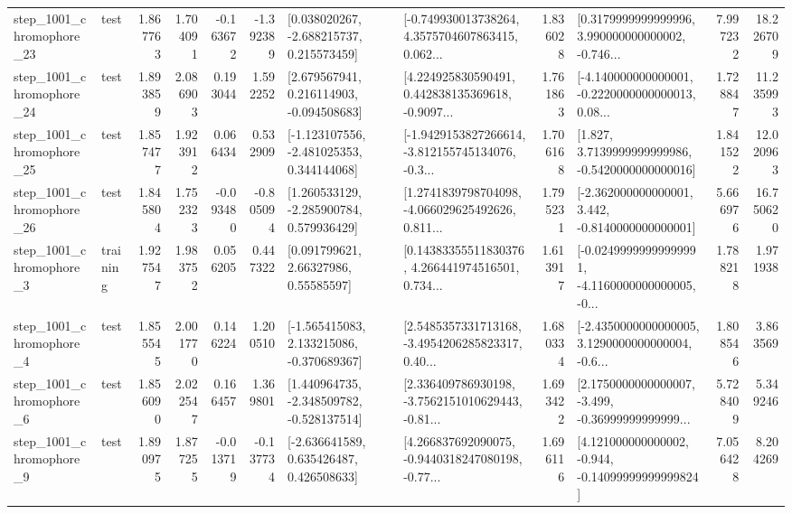 \begin{tabular}{llrrrrllrlrr}
 step\_1001\_chromophore\_23 &      test &      1.867763 &    1.704091 &     -0.163672 & -1.392389 &    [0.038020267, -2.688215737, 0.215573459] &  [-0.749930013738264, 4.3575704607863415, 0.062... &       1.836028 &  [0.3179999999999996, 3.990000000000002, -0.746... &            7.997232 &         18.226709 \\
 step\_1001\_chromophore\_24 &      test &      1.893859 &    2.086903 &      0.193044 &  1.592252 &    [2.679567941, 0.216114903, -0.094508683] &  [4.224925830590491, 0.442838135369618, -0.9097... &       1.761863 &  [-4.140000000000001, -0.2220000000000013, 0.08... &            1.728847 &         11.235993 \\
 step\_1001\_chromophore\_25 &      test &      1.857477 &    1.923912 &      0.066434 &  0.532909 &   [-1.123107556, -2.481025353, 0.344144068] &  [-1.9429153827266614, -3.812155745134076, -0.3... &       1.706168 &   [1.827, 3.7139999999999986, -0.5420000000000016] &            1.841522 &         12.020963 \\
 step\_1001\_chromophore\_26 &      test &      1.845804 &    1.752323 &     -0.093480 & -0.805094 &    [1.260533129, -2.285900784, 0.579936429] &  [1.2741839798704098, -4.066029625492626, 0.811... &       1.795231 &   [-2.362000000000001, 3.442, -0.8140000000000001] &            5.666976 &         16.750620 \\
  step\_1001\_chromophore\_3 &  training &      1.927547 &    1.983752 &      0.056205 &  0.447322 &       [0.091799621, 2.66327986, 0.55585597] &  [0.14383355511830376, 4.266441974516501, 0.734... &       1.613917 &  [-0.02499999999999991, -4.1160000000000005, -0... &            1.788218 &          1.971938 \\
  step\_1001\_chromophore\_4 &      test &      1.855545 &    2.001770 &      0.146224 &  1.200510 &   [-1.565415083, 2.133215086, -0.370689367] &  [2.5485357331713168, -3.4954206285823317, 0.40... &       1.680334 &  [-2.4350000000000005, 3.1290000000000004, -0.6... &            1.808546 &          3.863569 \\
  step\_1001\_chromophore\_6 &      test &      1.856090 &    2.022547 &      0.166457 &  1.369801 &   [1.440964735, -2.348509782, -0.528137514] &  [2.336409786930198, -3.7562151010629443, -0.81... &       1.693422 &  [2.1750000000000007, -3.499, -0.36999999999999... &            5.728409 &          5.349246 \\
  step\_1001\_chromophore\_9 &      test &      1.890975 &    1.877255 &     -0.013719 & -0.137734 &    [-2.636641589, 0.635426487, 0.426508633] &  [4.266837692090075, -0.9440318247080198, -0.77... &       1.696116 &  [4.121000000000002, -0.944, -0.14099999999999824] &            7.056428 &          8.204269 \\

\end{tabular}
